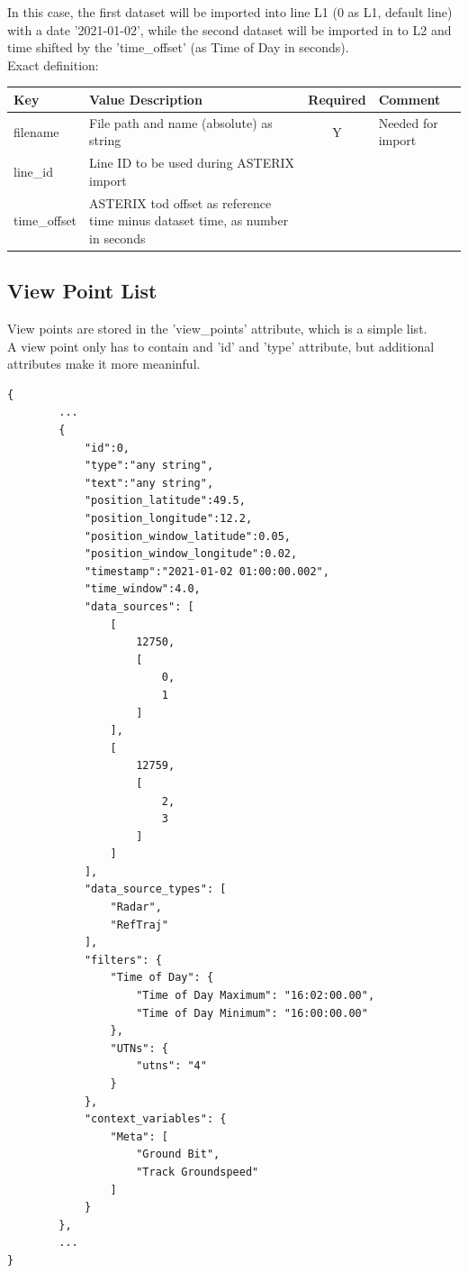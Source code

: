 In this case, the first dataset will be imported into line L1 (0 as L1, default line) with a date '2021-01-02', 
while the second dataset will be imported in to L2 and time shifted by the 'time\_offset' (as Time of Day in seconds). \\

Exact definition:

\begin{center}
 \begin{table}[H]
  \begin{tabularx}{\textwidth}{ | l | X | c | X | }
    \hline
    \textbf{Key} & \textbf{Value Description} & \textbf{Required} & \textbf{Comment} \\ \hline
    filename & File path and name (absolute) as string & Y & Needed for import \\ \hline
    line\_id & Line ID to be used during ASTERIX import & & \\ \hline
    time\_offset & ASTERIX tod offset as reference time minus dataset time, as number in seconds & & \\ \hline
\end{tabularx}
\end{table}
\end{center}

\subsection{View Point List}

View points are stored in the 'view\_points' attribute, which is a simple list. \\

A view point only has to contain and 'id' and 'type' attribute, but additional attributes make it more meaninful.

\begin{lstlisting}[basicstyle=\small\ttfamily]
{
        ...
        {
            "id":0,
            "type":"any string",
            "text":"any string",
            "position_latitude":49.5,
            "position_longitude":12.2,
            "position_window_latitude":0.05,
            "position_window_longitude":0.02,
            "timestamp":"2021-01-02 01:00:00.002",
            "time_window":4.0,
            "data_sources": [
                [
                    12750,
                    [
                        0,
                        1
                    ]
                ],
                [
                    12759,
                    [
                        2,
                        3
                    ]
                ]
            ],
            "data_source_types": [
                "Radar",
                "RefTraj"
            ],
            "filters": {
                "Time of Day": {
                    "Time of Day Maximum": "16:02:00.00",
                    "Time of Day Minimum": "16:00:00.00"
                },
                "UTNs": {
                    "utns": "4"
                }
            },
            "context_variables": {
                "Meta": [
                    "Ground Bit",
                    "Track Groundspeed"
                ]
            }
        },
        ...
}
\end{lstlisting}

